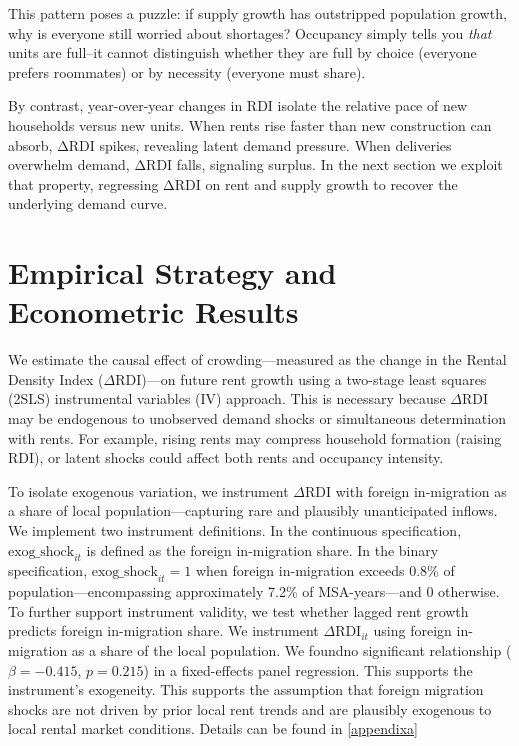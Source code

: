 \documentclass[APA,Times1COL]{WileyNJDv5} %
\begin{document}
This pattern poses a puzzle: if supply growth has outstripped population growth, why is everyone still worried about shortages? Occupancy simply tells you \textit{that} units are full--it cannot distinguish whether they are full by choice (everyone prefers roommates) or by necessity (everyone must share).

By contrast, year-over-year changes in RDI isolate the relative pace of new households versus new units. When rents rise faster than new construction can absorb, ΔRDI spikes, revealing latent demand pressure. When deliveries overwhelm demand, ΔRDI falls, signaling surplus. In the next section we exploit that property, regressing ΔRDI on rent and supply growth to recover the underlying demand curve.

\section{Empirical Strategy and Econometric Results}
\label{sec:instrumental-variable}

We estimate the causal effect of crowding—measured as the change in the Rental Density Index (\(\Delta \text{RDI}\))—on future rent growth using a two-stage least squares (2SLS) instrumental variables (IV) approach. This is necessary because \(\Delta \text{RDI}\) may be endogenous to unobserved demand shocks or simultaneous determination with rents. For example, rising rents may compress household formation (raising RDI), or latent shocks could affect both rents and occupancy intensity.

To isolate exogenous variation, we instrument \(\Delta \text{RDI}\) with foreign in-migration as a share of local population—capturing rare and plausibly unanticipated inflows. We implement two instrument definitions. In the continuous specification, \(\text{exog\_shock}_{it}\) is defined as the foreign in-migration share. In the binary specification, \(\text{exog\_shock}_{it} = 1\) when foreign in-migration exceeds 0.8\% of population—encompassing approximately 7.2\% of MSA-years—and 0 otherwise. To further support instrument validity, we test whether lagged rent growth predicts foreign in-migration share. We instrument $\Delta \text{RDI}_{it}$ using foreign in-migration as a share of the local population. We foundno significant relationship ($\beta = -0.415$, $p = 0.215$) in a fixed-effects panel regression. This supports the instrument’s exogeneity. This supports the assumption that foreign migration shocks are not driven by prior local rent trends and are plausibly exogenous to local rental market conditions. Details can be found in \ref{appendixa}
\end{document}
